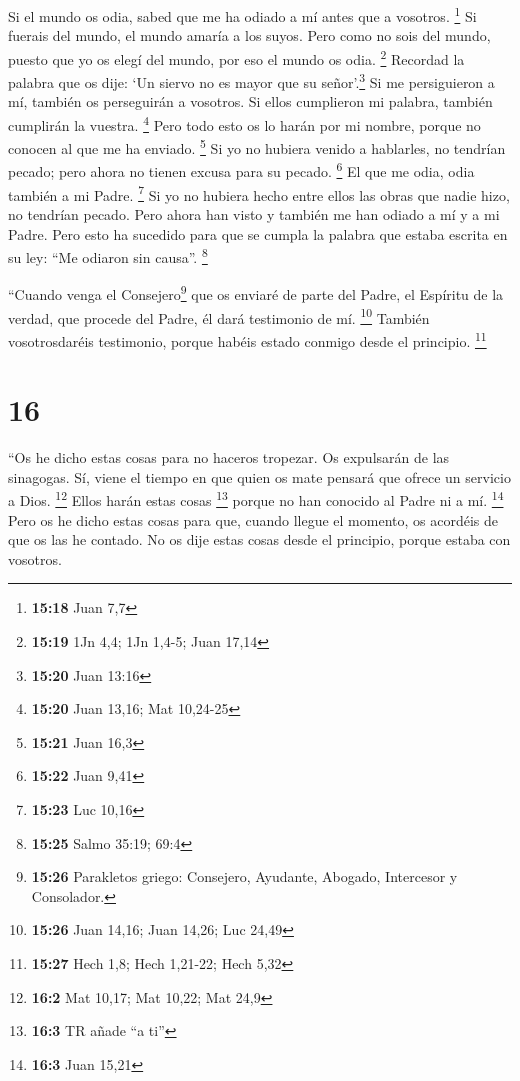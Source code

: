  Si el mundo os odia, sabed que me ha odiado a mí antes
que a vosotros. \footnote{\textbf{15:18} Juan 7,7}  Si
fuerais del mundo, el mundo amaría a los suyos. Pero como no sois del
mundo, puesto que yo os elegí del mundo, por eso el mundo os odia.
\footnote{\textbf{15:19} 1Jn 4,4; 1Jn 1,4-5; Juan 17,14} 
Recordad la palabra que os dije: `Un siervo no es mayor que su
señor'.\footnote{\textbf{15:20} Juan 13:16} Si me persiguieron a mí,
también os perseguirán a vosotros. Si ellos cumplieron mi palabra,
también cumplirán la vuestra. \footnote{\textbf{15:20} Juan 13,16; Mat
  10,24-25}  Pero todo esto os lo harán por mi nombre,
porque no conocen al que me ha enviado. \footnote{\textbf{15:21} Juan
  16,3}  Si yo no hubiera venido a hablarles, no tendrían
pecado; pero ahora no tienen excusa para su pecado. \footnote{\textbf{15:22}
  Juan 9,41}  El que me odia, odia también a mi Padre.
\footnote{\textbf{15:23} Luc 10,16}  Si yo no hubiera
hecho entre ellos las obras que nadie hizo, no tendrían pecado. Pero
ahora han visto y también me han odiado a mí y a mi Padre.
 Pero esto ha sucedido para que se cumpla la palabra que
estaba escrita en su ley: ``Me odiaron sin causa''. \footnote{\textbf{15:25}
  Salmo 35:19; 69:4}

 ``Cuando venga el Consejero\footnote{\textbf{15:26}
  Parakletos griego: Consejero, Ayudante, Abogado, Intercesor y
  Consolador.} que os enviaré de parte del Padre, el Espíritu de la
verdad, que procede del Padre, él dará testimonio de mí. \footnote{\textbf{15:26}
  Juan 14,16; Juan 14,26; Luc 24,49}  También
vosotrosdaréis testimonio, porque habéis estado conmigo desde el
principio. \footnote{\textbf{15:27} Hech 1,8; Hech 1,21-22; Hech 5,32}

\hypertarget{section-15}{%
\section{16}\label{section-15}}

 ``Os he dicho estas cosas para no haceros tropezar.
 Os expulsarán de las sinagogas. Sí, viene el tiempo en
que quien os mate pensará que ofrece un servicio a Dios. \footnote{\textbf{16:2}
  Mat 10,17; Mat 10,22; Mat 24,9}  Ellos harán estas cosas
\footnote{\textbf{16:3} TR añade ``a ti''} porque no han conocido al
Padre ni a mí. \footnote{\textbf{16:3} Juan 15,21}  Pero
os he dicho estas cosas para que, cuando llegue el momento, os acordéis
de que os las he contado. No os dije estas cosas desde el principio,
porque estaba con vosotros.

